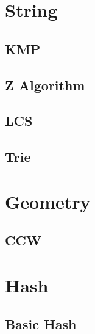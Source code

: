 \documentclass[9pt,landscape,a4paper,twocolumn]{extarticle}
\begin{document}
\section{String}

\subsection{KMP}


\subsection{Z Algorithm}


\subsection{LCS}


\subsection{Trie}


\section{Geometry}

\subsection{CCW}


\section{Hash}

\subsection{Basic Hash}

\end{document}
